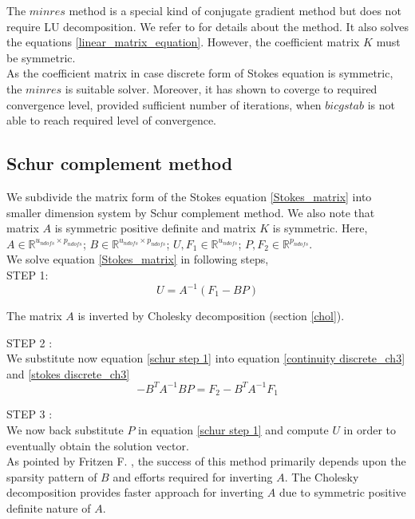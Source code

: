 \documentclass[a4paper]{book}
\begin{document}
The $minres$ method is a special kind of conjugate gradient method but does not require LU decomposition. We refer to \cite{minres} for details about the method. It also solves the equations \ref{linear_matrix_equation}. However, the coefficient matrix $K$ must be symmetric. \\

As the coefficient matrix in case discrete form of Stokes equation is symmetric, the $minres$ is suitable solver. Moreover, it has shown to coverge to required convergence level, provided sufficient number of iterations, when $bicgstab$ is not able to reach required level of convergence.

\subsection{Schur complement method} \label{schur}

We subdivide the matrix form of the Stokes equation \eqref{Stokes_matrix} into smaller dimension system by Schur complement method. We also note that matrix $A$ is symmetric positive definite and matrix $K$ is symmetric.
Here, $A \in \mathbb{R}^{u_{ndofs} \times p_{ndofs}}$; $B \in \mathbb{R}^{u_{ndofs} \times p_{ndofs}}$; $U,F_1 \in \mathbb{R}^{u_{ndofs}}$; $P, F_2 \in \mathbb{R}^{p_{ndofs}}$. \\

We solve equation \eqref{Stokes_matrix} in following steps,\\

STEP 1: \\ 
\begin{equation}\label{schur step 1}
U = A^{-1}(F_1 - BP) 
\end{equation}

The matrix $A$ is inverted by Cholesky decomposition (section \ref{chol}). 

STEP 2 : \\
We substitute now equation \eqref{schur step 1} into equation \eqref{continuity discrete_ch3} and \eqref{stokes discrete_ch3}
\begin{equation}\label{schur step 2}
- B^T A^{-1} B P = F_2 - B^T A^{-1} F_1
\end{equation}

STEP 3 : \\
We now back substitute $P$ in equation \eqref{schur step 1} and compute $U$ in order to eventually obtain the solution vector.
\\

As pointed by Fritzen F. \cite{Fritzen}, the success of this method primarily depends upon the sparsity pattern of $B$ and efforts required for inverting $A$. The Cholesky decomposition provides faster approach for inverting $A$ due to symmetric positive definite nature of $A$. \\
\end{document}
